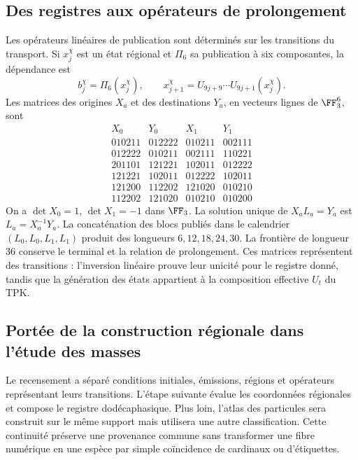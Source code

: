 \subsection{Des registres aux opérateurs de prolongement}

Les opérateurs linéaires de publication sont déterminés sur les
transitions du transport. Si \(x_j^\chi\) est un état régional
et \(\Pi_6\) sa publication à six composantes, la dépendance est
\[
 b_j^\chi=\Pi_6(x_j^\chi),\qquad
 x_{j+1}^\chi=U_{9j+9}\cdots U_{9j+1}(x_j^\chi).
\]
Les matrices des origines \(X_a\) et des destinations \(Y_a\), en
vecteurs lignes de \(\FF_3^6\), sont
\[
\begin{array}{c|c|c|c}
X_0&Y_0&X_1&Y_1\\\hline
010211&012222&010211&002111\\
012222&010211&002111&110221\\
201101&121221&102011&012222\\
121221&102011&012222&102011\\
121200&112202&121020&010210\\
112202&121020&010210&010200
\end{array}
\]
On a \(\det X_0=1\), \(\det X_1=-1\) dans \(\FF_3\).
La solution unique de \(X_aL_a=Y_a\) est \(L_a=X_a^{-1}Y_a\).
La concaténation des blocs publiés dans le calendrier
\((L_0,L_0,L_1,L_1)\) produit des longueurs
\(6,12,18,24,30\). La frontière de longueur \(36\) conserve
le terminal et la relation de prolongement. Ces matrices
représentent des transitions : l'inversion linéaire prouve leur unicité
pour le registre donné, tandis que la génération des états
appartient à la composition effective \(U_t\) du TPK.

\subsection{Portée de la construction régionale dans l’étude des masses}

Le recensement a séparé conditions initiales, émissions, régions et
opérateurs représentant leurs transitions. L’étape suivante
évalue les coordonnées régionales et compose le registre dodécaphasique.
Plus loin, l’atlas des particules sera construit sur le même
support mais utilisera une autre classification. Cette continuité préserve
une provenance commune sans transformer une fibre numérique en une
espèce par simple coïncidence de cardinaux ou d’étiquettes.
